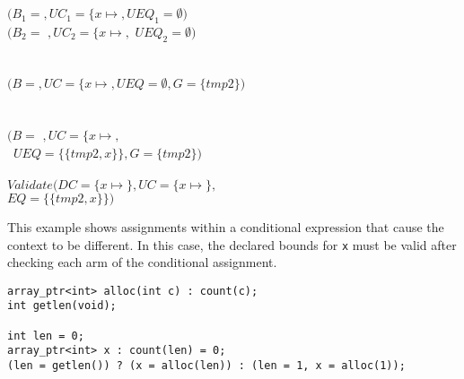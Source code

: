 \begin{small}
\begin{tabbing}
\>\>\\
\>\>\\
\>\>\>\>$(B_1 = $$, {UC}_1 = \{x\mapsto$$,
                {UEQ}_1 = \emptyset)$\\
\>\>\>\>$(B_2 = $ $, {UC}_2 = \{x\mapsto$$,$
               ${UEQ}_2 = \emptyset)$\\
\\
\>\>\\
\>\>\>\>$(B = $$, UC = \{x\mapsto$$,
                UEQ = \emptyset, G = \{ tmp2 \})$\\
\\
\>\>\\
\>\>\>$(B = $ $, UC = \{x\mapsto$$,$\\
\>\>\>\>~$UEQ = \{\{tmp2, x\}\}, G = \{tmp2 \})$\\
\\
\>\>$Validate(DC = \{x \mapsto$$\},
                   UC = \{x\mapsto $$\},$\\
\>\>\>\>\>\>$EQ = \{\{tmp2, x\}\})$\\
\end{tabbing}
\end{small}

This example shows assignments within a conditional expression that cause the context to be
different.  In this case, the declared bounds for \lstinline+x+ must be valid after checking each arm
of the conditional  assignment.
\begin{lstlisting}
array_ptr<int> alloc(int c) : count(c);
int getlen(void);

int len = 0;
array_ptr<int> x : count(len) = 0;
(len = getlen()) ? (x = alloc(len)) : (len = 1, x = alloc(1));
\end{lstlisting}

